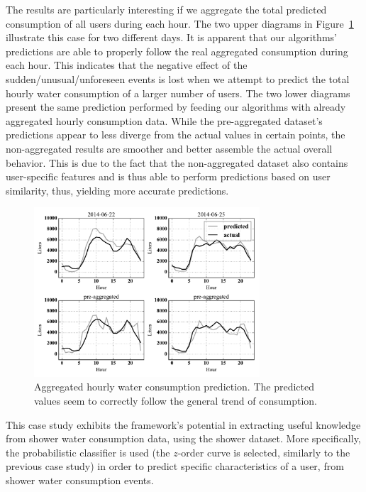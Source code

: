 The results are particularly interesting if we aggregate the total predicted consumption of all users during each hour. The two upper diagrams in Figure~\ref{figure9} illustrate this case for two different days. It is apparent that our algorithms' predictions are able to properly follow the real aggregated consumption during each hour. This indicates that the negative effect of the sudden/unusual/unforeseen events is lost when we attempt to predict the total hourly water consumption of a larger number of users. The two lower diagrams present the same prediction performed by feeding our algorithms with already aggregated hourly consumption data. While the pre-aggregated dataset's predictions appear to less diverge from the actual values in certain points, the non-aggregated results are smoother and better assemble the actual overall behavior. This is due to the fact that the non-aggregated dataset also contains user-specific features and is thus able to perform predictions based on user similarity, thus, yielding more accurate predictions.

\begin{figure}[h!]
	\centering
	\includegraphics[width=0.75\textwidth]{figures/figure9.pdf}
	\caption{Aggregated hourly water consumption prediction. The predicted values seem to correctly follow the general trend of consumption.}
	\label{figure9}
\end{figure}

\label{subsubsec:case_study2}
This case study exhibits the framework's potential in extracting useful knowledge from shower water consumption data, using the shower dataset. More specifically, the probabilistic classifier is used (the $z$-order curve is selected, similarly to the previous case study) in order to predict specific characteristics of a user, from shower water consumption events.

